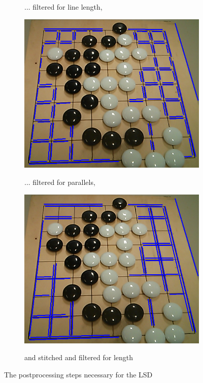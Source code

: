 \begin{figure}
\begin{subfigure}{0.23\textwidth}
			\caption{... filtered for line length,}
		\end{subfigure}
		\hfill
		\begin{subfigure}{0.23\textwidth}
			\includegraphics[width=\textwidth]{images/lsd_parallel.png}
			\label{fig:lsdPostprocessingParallel}
			\caption{... filtered for parallels, }
		\end{subfigure}
		\hfill
		\begin{subfigure}{0.23\textwidth}
			\includegraphics[width=\textwidth]{images/lsd_final.png}
			\label{fig:lsdPostprocessingFinal}
			\caption{and stitched and filtered for length}
		\end{subfigure}

		\caption{The postprocessing steps necessary for the LSD}
	\end{figure}


